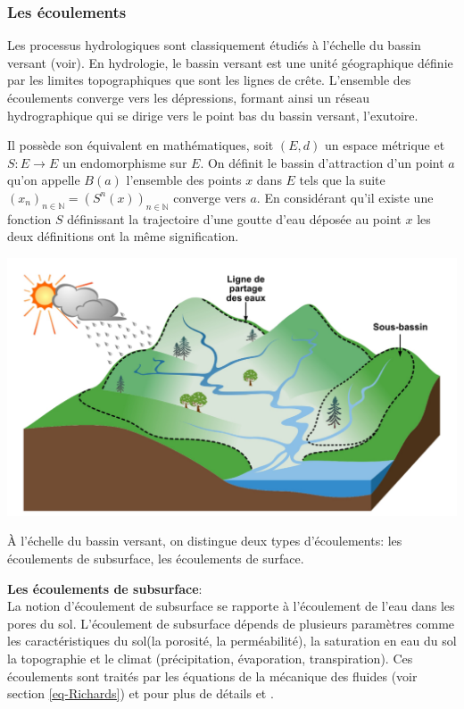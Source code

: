 \documentclass[a4paper,11pt]{article}
\begin{document}
\subsubsection{Les écoulements}

Les processus hydrologiques sont classiquement étudiés à l’échelle du bassin versant (voir). En hydrologie, le bassin versant est une unité géographique définie par les limites topographiques que sont les lignes de crête. L’ensemble des écoulements converge vers les dépressions, formant ainsi un réseau hydrographique qui se dirige vers le point bas du bassin versant, l’exutoire.

Il possède son équivalent en mathématiques, soit $(E,d)$ un espace métrique et $S:E\to E$ un endomorphisme sur $E$. On définit le bassin d'attraction d'un point $a$ qu'on appelle $B(a)$ l'ensemble des points $x$ dans $E$ tels que la suite $(x_n)_{n \in \mathbb{N}}=(S^n(x))_{n \in \mathbb{N}}$ converge vers $a$. En considérant qu'il existe une fonction $S$ définissant la trajectoire d'une goutte d'eau déposée au point $x$ les deux définitions ont la même signification.

\begin{center}
	\captionsetup{type=figure}
	\includegraphics[scale=0.15]{bassin_versant.png}
\end{center} 

À l’échelle du bassin versant, on distingue deux types d’écoulements: les écoulements de subsurface, les écoulements de surface. 

\textbf{Les écoulements de subsurface}:\\

La notion d'écoulement de subsurface se rapporte à l'écoulement de l'eau dans les pores du sol. L'écoulement de subsurface dépends de plusieurs paramètres comme les caractéristiques du sol(la porosité, la perméabilité), la saturation en eau du sol la topographie et le climat (précipitation, évaporation, transpiration). Ces écoulements sont traités par les équations de la mécanique des fluides (voir section  \ref{eq-Richards}) et pour plus de détails \cite{maquin2016developpement} et \cite{marsily_de1986quantitative}. 
\end{document}
